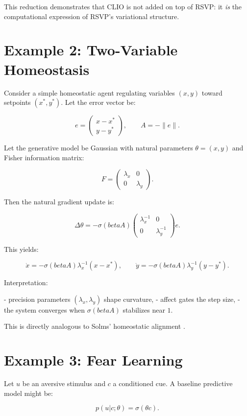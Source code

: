 \documentclass[12pt,oneside]{book}
\theoremstyle{plain}
\theoremstyle{definition}
\let\citep\parencite
\def\beta{beta}%
\begin{document}
This reduction demonstrates that CLIO is not added on top of RSVP: it \emph{is}
the computational expression of RSVP's variational structure.

\section{Example 2: Two-Variable Homeostasis}

Consider a simple homeostatic agent regulating variables $(x,y)$ toward setpoints
$(x^\ast, y^\ast)$.
Let the error vector be:

\[
e =
\begin{pmatrix}
x - x^\ast \\
y - y^\ast
\end{pmatrix},
\qquad
A = -\|e\|.
\]

Let the generative model be Gaussian with natural parameters $\theta = (x,y)$
and Fisher information matrix:

\[
F =
\begin{pmatrix}
\lambda_x & 0 \\
0 & \lambda_y
\end{pmatrix}.
\]

Then the natural gradient update is:

\[
\Delta \theta
=
- \sigma(\beta A)
\begin{pmatrix}
\lambda_x^{-1} & 0 \\
0 & \lambda_y^{-1}
\end{pmatrix}
e.
\]

This yields:

\[
\dot{x} =
- \sigma(\beta A) \lambda_x^{-1} (x - x^\ast),
\qquad
\dot{y} =
- \sigma(\beta A) \lambda_y^{-1} (y - y^\ast).
\]

Interpretation:

- precision parameters $(\lambda_x,\lambda_y)$ shape curvature,
- affect gates the step size,
- the system converges when $\sigma(\beta A)$ stabilizes near $1$.

This is directly analogous to Solms’ homeostatic alignment
\citep{solms2021hidden}.

\section{Example 3: Fear Learning}

Let $u$ be an aversive stimulus and $c$ a conditioned cue.
A baseline predictive model might be:

\[
p(u|c;\theta) = \sigma(\theta c).
\]
\end{document}
